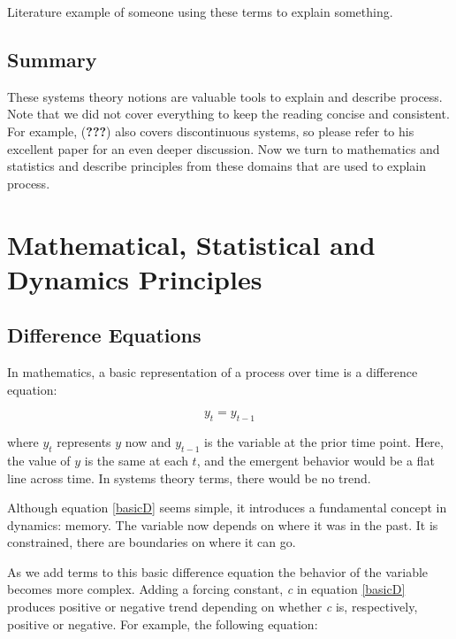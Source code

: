 \documentclass[english,,man]{apa6}
\theoremstyle{definition}
\theoremstyle{definition}
\theoremstyle{definition}
\theoremstyle{remark}
\begin{document}
Literature example of someone using these terms to explain something.

\hypertarget{summary}{%
\subsection{Summary}\label{summary}}

These systems theory notions are valuable tools to explain and describe
process. Note that we did not cover everything to keep the reading
concise and consistent. For example, ({\textbf{???}}) also covers
discontinuous systems, so please refer to his excellent paper for an
even deeper discussion. Now we turn to mathematics and statistics and
describe principles from these domains that are used to explain process.

\hypertarget{mathematical-statistical-and-dynamics-principles}{%
\section{Mathematical, Statistical and Dynamics
Principles}\label{mathematical-statistical-and-dynamics-principles}}

\hypertarget{difference-equations}{%
\subsection{Difference Equations}\label{difference-equations}}

In mathematics, a basic representation of a process over time is a
difference equation:

\begin{equation}
\label{basicD}
y_{t} = y_{t - 1}
\end{equation}

\noindent where \(y_{t}\) represents \(y\) now and \(y_{t-1}\) is the
variable at the prior time point. Here, the value of \(y\) is the same
at each \(t\), and the emergent behavior would be a flat line across
time. In systems theory terms, there would be no trend.

Although equation \ref{basicD} seems simple, it introduces a fundamental
concept in dynamics: memory. The variable now depends on where it was in
the past. It is constrained, there are boundaries on where it can go.

As we add terms to this basic difference equation the behavior of the
variable becomes more complex. Adding a forcing constant, \emph{c} in
equation \ref{basicD} produces positive or negative trend depending on
whether \emph{c} is, respectively, positive or negative. For example,
the following equation:
\end{document}
